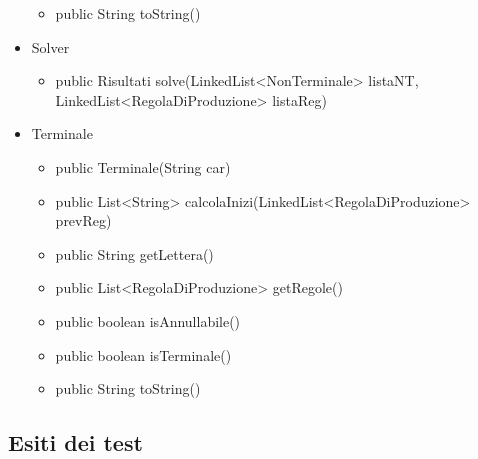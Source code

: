 \documentclass[12pt]{article}
\begin{document}
\begin{itemize}
\begin{itemize}
\item public String toString()
\end{itemize}
\item Solver
\begin{itemize}
\item public Risultati solve(LinkedList<NonTerminale> listaNT, \\
\hspace*{104pt} LinkedList<RegolaDiProduzione> listaReg)
\end{itemize}
\item Terminale
\begin{itemize}
\item public Terminale(String car)
\item public List<String> calcolaInizi(LinkedList<RegolaDiProduzione> prevReg)
\item public String getLettera()
\item public List<RegolaDiProduzione> getRegole()
\item public boolean isAnnullabile()
\item public boolean isTerminale()
\item public String toString()
\end{itemize}
\end{itemize}
\pagebreak



\subsection{Esiti dei test}
\end{document}
